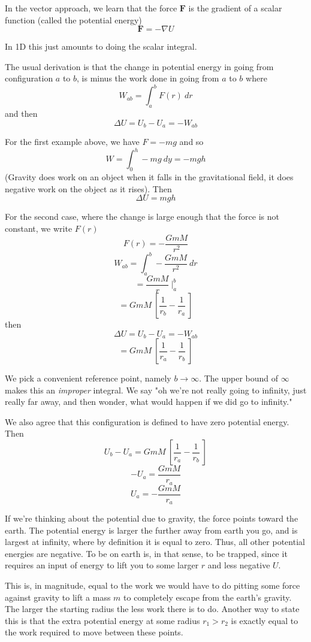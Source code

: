 \documentclass[11pt, oneside]{article}
\begin{document}
In the vector approach, we learn that the force $\mathbf{F}$ is the gradient of a scalar function (called the potential energy)
\[ \mathbf{F} = - \nabla U \]

In 1D this just amounts to doing the scalar integral.

The usual derivation is that the change in potential energy in going from configuration $a$ to $b$, is minus the work done in going from $a$ to $b$ where
\[ W_{ab} = \int_a^b F(r) \  dr \]
and then
\[ \Delta U = U_b - U_a = - W_{ab} \]

For the first example above, we have $F = -mg$ and so
\[ W = \int_0^h -mg \ dy = -mgh \]
(Gravity does work on an object when it falls in the gravitational field, it does negative work on the object as it rises).  Then
\[ \Delta U = mgh \]

For the second case, where the change is large enough that the force is not constant, we write $F(r)$
\[ F(r) = - \frac{GmM}{r^2} \]
\[ W_{ab} = \int_a^b - \frac{GmM}{r^2} \ dr \]
\[ = \frac{GmM}{r} \ \bigg |_a^b \]
\[ = GmM \ [ \frac{1}{r_b} - \frac{1}{r_a} \ ] \]
then
\[ \Delta U = U_b - U_a = -W_{ab} \]
\[ = GmM \ [ \frac{1}{r_a} - \frac{1}{r_b} \ ] \]

We pick a convenient reference point, namely $ b \rightarrow \infty$.  The upper bound of $\infty$ makes this an \emph{improper} integral.  We say "oh we're not really going to infinity, just really far away, and then wonder, what would happen if we did go to infinity."

We also agree that this configuration is defined to have zero potential energy.  Then
\[ U_b - U_a = GmM \ [ \frac{1}{r_a} - \frac{1}{r_b} \ ] \]
\[ -U_a = \frac{GmM}{r_a}  \]
\[ U_a = -\frac{GmM}{r_a}  \]

If we're thinking about the potential due to gravity, the force points toward the earth.  The potential energy is larger the further away from earth you go, and is largest at infinity, where by definition it is equal to zero.  Thus, all other potential energies are negative.  To be on earth is, in that sense, to be trapped, since it requires an input of energy to lift you to some larger $r$ and less negative $U$.

This is, in magnitude, equal to the work we would have to do pitting some force against gravity to lift a mass $m$ to completely escape from the earth's gravity.  The larger the starting radius the less work there is to do.  Another way to state this is that the extra potential energy at some radius $r_1 > r_2$ is exactly equal to the work required to move between these points.
\end{document}
